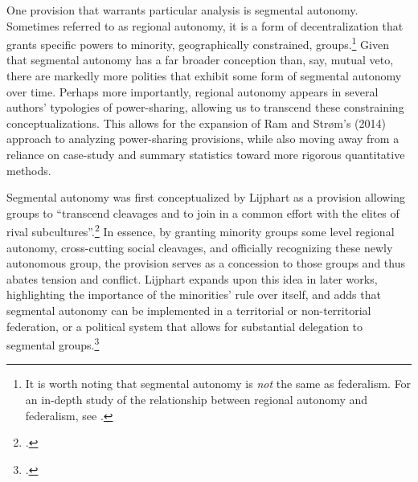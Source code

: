 \documentclass[12pt]{article}
\begin{document}
One provision that warrants particular analysis is segmental autonomy. Sometimes referred to as regional autonomy, it is a form of decentralization that grants specific powers to minority, geographically constrained, groups.\footnote{It is worth noting that segmental autonomy is \textit{not} the same as federalism. For an in-depth study of the relationship between regional autonomy and federalism, see \cite{lluch_autonomism_2012}.} Given that segmental autonomy has a far broader conception than, say, mutual veto, there are markedly more polities that exhibit some form of segmental autonomy over time. Perhaps more importantly, regional autonomy appears in several authors' typologies of power-sharing, allowing us to transcend these constraining conceptualizations. This allows for the expansion of Ram and Strøm's (2014) approach to analyzing power-sharing provisions, while also moving away from a reliance on case-study and summary statistics toward more rigorous quantitative methods.

Segmental autonomy was first conceptualized by Lijphart as a provision allowing groups to ``transcend cleavages and to join in a common effort with the elites of rival subcultures''.\footcite[216]{lijphart_consociational_1969} In essence, by granting minority groups some level regional autonomy, cross-cutting social cleavages, and officially recognizing these newly autonomous group, the provision serves as a concession to those groups and thus abates tension and conflict. Lijphart expands upon this idea in later works, highlighting the importance of the minorities’ rule over itself, and adds that segmental autonomy can be implemented in a territorial or non-territorial federation, or a political system that allows for substantial delegation to segmental groups.\footcite{lijphart_consociational_1977, lijphart_non-majoritarian_1985} 
\end{document}
